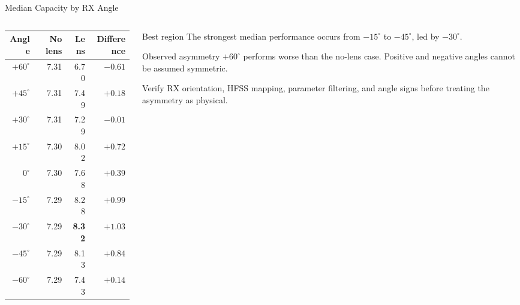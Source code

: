 \begin{frame}[t,shrink=12]{Median Capacity by RX Angle}
    \begin{columns}[T,onlytextwidth]
        \begin{column}{0.55\textwidth}
            \centering
            \scriptsize
            \begin{tabular}{rrrr}
                \toprule
                \textbf{Angle} & \textbf{No lens} & \textbf{Lens} &
                \textbf{Difference} \\
                \midrule
                $+60^\circ$ & 7.31 & 6.70 & $-0.61$ \\
                $+45^\circ$ & 7.31 & 7.49 & $+0.18$ \\
                $+30^\circ$ & 7.31 & 7.29 & $-0.01$ \\
                $+15^\circ$ & 7.30 & 8.02 & $+0.72$ \\
                $0^\circ$   & 7.30 & 7.68 & $+0.39$ \\
                $-15^\circ$ & 7.29 & 8.28 & $+0.99$ \\
                $-30^\circ$ & 7.29 & \textbf{8.32} & $\mathbf{+1.03}$ \\
                $-45^\circ$ & 7.29 & 8.13 & $+0.84$ \\
                $-60^\circ$ & 7.29 & 7.43 & $+0.14$ \\
                \bottomrule
            \end{tabular}
        \end{column}
        \begin{column}{0.41\textwidth}
            \begin{exampleblock}{Best region}
                The strongest median performance occurs from
                $-15^\circ$ to $-45^\circ$, led by $-30^\circ$.
            \end{exampleblock}
            \begin{alertblock}{Observed asymmetry}
                $+60^\circ$ performs worse than the no-lens case. Positive
                and negative angles cannot be assumed symmetric.
            \end{alertblock}
            \small
            Verify RX orientation, HFSS mapping, parameter filtering, and
            angle signs before treating the asymmetry as physical.
        \end{column}
    \end{columns}
\end{frame}

